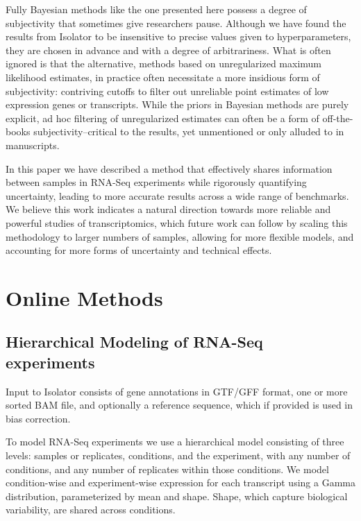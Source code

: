 \documentclass[twocolumn]{article}
\begin{document}
Fully Bayesian methods like the one presented here possess a degree of
subjectivity that sometimes give researchers pause. Although we have found the
results from Isolator to be insensitive to precise values given to
hyperparameters, they are chosen in advance and with a degree of arbitrariness.
What is often ignored is that the alternative, methods based on unregularized
maximum likelihood estimates, in practice often necessitate a more insidious
form of subjectivity: contriving cutoffs to filter out unreliable point
estimates of low expression genes or transcripts. While the priors in Bayesian
methods are purely explicit, ad hoc filtering of unregularized estimates can
often be a form of off-the-books subjectivity--critical to the results, yet
unmentioned or only alluded to in manuscripts.

In this paper we have described a method that effectively shares information
between samples in RNA-Seq experiments while rigorously quantifying uncertainty,
leading to more accurate results across a wide range of benchmarks. We believe
this work indicates a natural direction towards more reliable and powerful
studies of transcriptomics, which future work can follow by scaling this
methodology to larger numbers of samples, allowing for more flexible models, and
accounting for more forms of uncertainty and technical effects.

\section{Online Methods}\label{online-methods}

\subsection{Hierarchical Modeling of RNA-Seq
experiments}\label{hierarchical-modeling-of-rna-seq-experiments}

Input to Isolator consists of gene annotations in GTF/GFF format, one
or more sorted BAM \cite{Li:2009ka} file, and optionally a reference sequence,
which if provided is used in bias correction.

To model RNA-Seq experiments we use a hierarchical model consisting of
three levels: samples or replicates, conditions, and the experiment, with any
number of conditions, and any number of replicates within those
conditions. We model condition-wise and experiment-wise expression for
each transcript using a Gamma distribution, parameterized by mean and
shape. Shape, which capture biological variability, are shared across
conditions.
\end{document}
